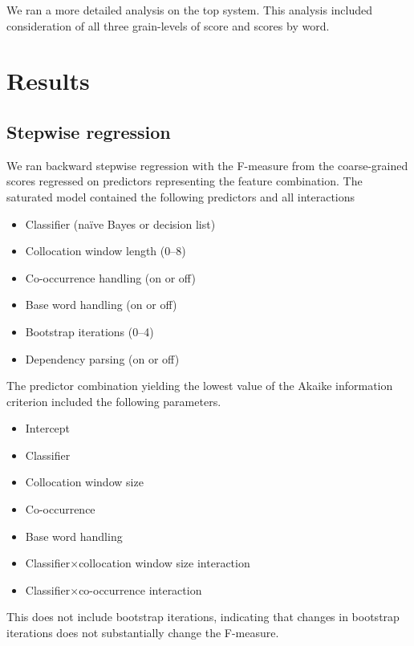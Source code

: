 \documentclass{article}
\newcommand{\naive}{na\"ive}
\begin{document}
We ran a more detailed analysis on the top system.  This analysis included
consideration of all three grain-levels of score and scores by word.

\section{Results}

\subsection{Stepwise regression}

We ran backward stepwise regression with the F-measure from the coarse-grained
scores regressed on predictors representing the feature combination.  The
saturated model contained the following predictors and all interactions

\begin{itemize}
\item Classifier (\naive{} Bayes or decision list)
\item Collocation window length (0--8)
\item Co-occurrence handling (on or off)
\item Base word handling (on or off)
\item Bootstrap iterations (0--4)
\item Dependency parsing (on or off)
\end{itemize}

The predictor combination yielding the lowest value of the Akaike information criterion
included the following parameters.

\begin{itemize}
\item Intercept
\item Classifier
\item Collocation window size
\item Co-occurrence
\item Base word handling
\item Classifier$\times$collocation window size interaction
\item Classifier$\times$co-occurrence interaction
\end{itemize}

This does not include bootstrap iterations, indicating that changes
in bootstrap iterations does not substantially change the F-measure.

\end{document}
